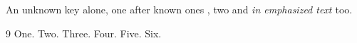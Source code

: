 \documentclass{article}
\begin{document}
An unknown key \cite{nokey} alone, one after known ones \cite{b,nokey,a}, two \cite{nokey,nope} and \emph{in emphasized text \cite{c,nokey}} too.

\begin{thebibliography}{9}
 One.
 Two.
 Three.
 Four.
 Five.
 Six.
\end{thebibliography}
\end{document}
